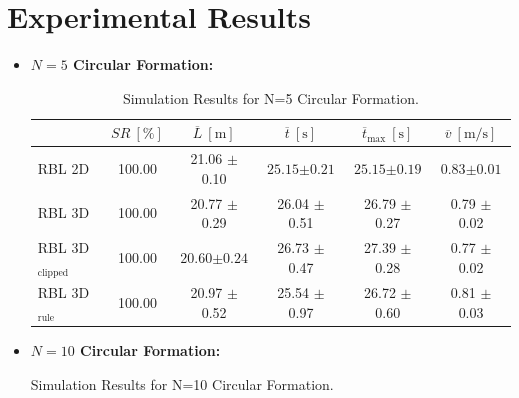 \chapter{Experimental Results}
    \label{chap:exp_sim_res}
    \begin{itemize}
        \item \textbf{$N = 5$ Circular Formation:}
            \begin{table}[H]
                \caption{Simulation Results for N=5 Circular Formation.}
                \label{n_5_circ}
                \centering
                \renewcommand{\arraystretch}{1.2}
                \begin{tabular}{|l|c|c|c|c|c|}
                \hline
                                            & \( SR \ [\%] \) & \( \overline{L} \ [\mathrm{m}] \) & \( \overline{t} \ [\mathrm{s}] \) & \( \overline{t}_{\text{max}} \ [\mathrm{s}] \) & \( \overline{v} \ [\mathrm{m/s}] \)     \\ \hline
                RBL 2D                      & 100.00          & 21.06 $\pm$ 0.10                  & $\mathbf{25.15} \boldsymbol{\pm} \mathbf{0.21}$                  & $\mathbf{25.15} \boldsymbol{\pm} \mathbf{0.19}$                               & $\mathbf{0.83} \boldsymbol{\pm} \mathbf{0.01}$                         \\ \hline
                RBL 3D                      & 100.00          & 20.77 $\pm$ 0.29                  & 26.04 $\pm$ 0.51                  & 26.79 $\pm$ 0.27                               & 0.79 $\pm$ 0.02                         \\ \hline
                RBL 3D\(_{\text{clipped}}\) & 100.00          & $\mathbf{20.60} \boldsymbol{\pm} \mathbf{0.24}$                  & 26.73 $\pm$ 0.47                  & 27.39 $\pm$ 0.28                               & 0.77 $\pm$ 0.02                         \\ \hline
                RBL 3D\(_{\text{rule}}\)                & 100.00          & 20.97 $\pm$ 0.52                  & 25.54 $\pm$ 0.97                  & 26.72 $\pm$ 0.60                               & 0.81 $\pm$ 0.03                         \\ \hline
                \end{tabular}
            \end{table}
        \item \textbf{$N = 10$ Circular Formation:}
            \begin{table}[H]
                \caption{Simulation Results for N=10 Circular Formation.}

\end{table}
\end{itemize}
